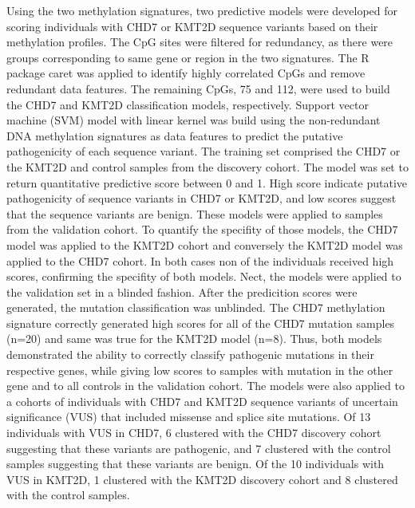 Using the two methylation signatures, two predictive models were developed for scoring individuals with CHD7 or KMT2D sequence variants based on their methylation profiles. The CpG sites were filtered for redundancy, as there were groups corresponding to same gene or region in the two signatures. The R package caret was applied to identify highly correlated CpGs and remove redundant data features. The remaining CpGs, 75 and 112, were used to build the CHD7 and KMT2D classification models, respectively. Support vector machine (SVM) model with linear kernel was build using the non-redundant DNA methylation signatures as data features to predict the putative pathogenicity of each sequence variant. The training set comprised the CHD7 or the KMT2D and control samples from the discovery cohort. The model was set to return quantitative predictive score between 0 and 1. High score indicate putative pathogenicity of sequence variants in CHD7 or KMT2D, and low scores suggest that the sequence variants are benign. These models were applied to samples from the validation cohort. To quantify the specifity of those models, the CHD7 model was applied to the KMT2D cohort and conversely the KMT2D model was applied to the CHD7 cohort. In both cases non of the individuals received high scores, confirming the specifity of both models. Nect, the models were applied to the validation set in a blinded fashion. After the predicition scores were generated, the mutation classification was unblinded. The CHD7 methylation signature correctly generated high scores for all of the CHD7 mutation samples (n=20) and same was true for the KMT2D model (n=8). Thus, both models demonstrated the ability to correctly classify pathogenic mutations in their respective genes, while giving low scores to samples with mutation in the other gene and to all controls in the validation cohort. The models were also applied to a cohorts of individuals with CHD7 and KMT2D sequence variants of uncertain significance (VUS) that included missense and splice site mutations. Of 13 individuals with VUS in CHD7, 6 clustered with the CHD7 discovery cohort suggesting that these variants are pathogenic, and 7 clustered with the control samples suggesting that these variants are benign. Of the 10 individuals with VUS in KMT2D, 1 clustered with the KMT2D discovery cohort and 8 clustered with the control samples.

